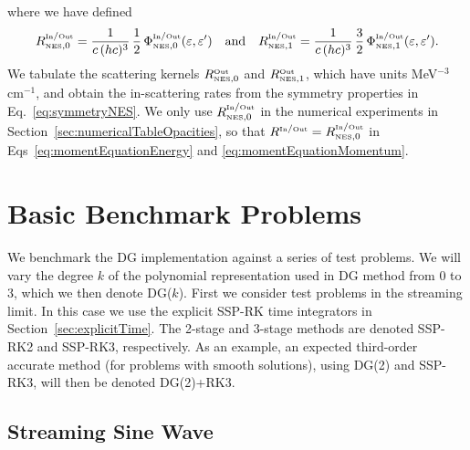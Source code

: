 \documentclass[10pt,preprint]{aastex}
\newcommand{\NES}{\mbox{\tiny NES}}
\begin{document}
where we have defined
\begin{equation}
  R_{\NES,0}^{\In/\Out}
  =\f{1}{c\,(hc)^{3}}\,\f{1}{2}\,\Phi_{\NES,0}^{\In/\Out}(\epsilonNu,\epsilonNu')
  \quad\text{and}\quad
  R_{\NES,1}^{\In/\Out}
  =\f{1}{c\,(hc)^{3}}\,\f{3}{2}\,\Phi_{\NES,1}^{\In/\Out}(\epsilonNu,\epsilonNu').  
\end{equation}
We tabulate the scattering kernels $R_{\NES,0}^{\Out}$ and $R_{\NES,1}^{\Out}$, which have units MeV$^{-3}$ cm$^{-1}$, and obtain the in-scattering rates from the symmetry properties in Eq.~\eqref{eq:symmetryNES}.  
We only use $R_{\NES,0}^{\In/\Out}$ in the numerical experiments in Section~\ref{sec:numericalTableOpacities}, so that $R^{\In/\Out}=R_{\NES,0}^{\In/\Out}$ in Eqs~\eqref{eq:momentEquationEnergy} and \eqref{eq:momentEquationMomentum}.  

\section{Basic Benchmark Problems}
\label{sec:numericalBasic}

We benchmark the DG implementation against a series of test problems.  
We will vary the degree $k$ of the polynomial representation used in DG method from 0 to 3, which we then denote DG($k$).  
First we consider test problems in the streaming limit.  
In this case we use the explicit SSP-RK time integrators in Section~\ref{sec:explicitTime}.  
The 2-stage and 3-stage methods are denoted SSP-RK2 and SSP-RK3, respectively.  
As an example, an expected third-order accurate method (for problems with smooth solutions), using DG(2) and SSP-RK3, will then be denoted DG(2)+RK3.  

\subsection{Streaming Sine Wave}
\end{document}
